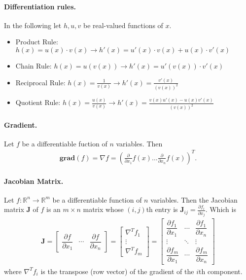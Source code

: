 \documentclass[a4paper,11pt]{article}
\begin{document}
\paragraph{Differentiation rules.} In the following let $h, u, v$ be real-valued functions of $x$.
\begin{itemize}
    \item Product Rule: $h(x) = u(x) \cdot v(x) \rightarrow h'(x) = u'(x) \cdot v(x) + u(x) \cdot v'(x)$
    \item Chain Rule: $h(x) = u(v(x)) \rightarrow  h'(x) = u'(v(x)) \cdot v'(x)$
    \item Reciprocal Rule: $h(x) = \frac{1}{v(x)} \rightarrow  h'(x) = \frac{v'(x)}{(v(x))^2}$
    \item Quotient Rule: $h(x) = \frac{u(x)}{v(x)} \rightarrow  h'(x) = \frac{v(x)u'(x) - u(x)v'(x)}{(v(x))^2}$
\end{itemize}

\paragraph{Gradient.} Let $f$ be a differentiable fuction of $n$ variables. Then
\begin{gather*}
    \mathbf{grad}(f) = \nabla f = \left( \frac{\partial}{\partial x_1} f(x) \dots \frac{\partial}{\partial x_n} f(x) \right)^T.
\end{gather*}

\paragraph{Jacobian Matrix.} Let $f: \mathbb{R}^{n} \rightarrow \mathbb{R}^{m}$ be a differentiable function of $n$ variables. Then the Jacobian matrix $\mathbf {J}$ of $f$ is an $m \times n$ matrix whose $(i,j)$th entry is ${\mathbf {J}_{ij}={\frac {\partial f_{i}}{\partial x_{j}}}}$. Which is 
\begin{gather*}
    {\mathbf {J} ={\begin{bmatrix}{\dfrac {\partial f }{\partial x_{1}}}&\cdots &{\dfrac {\partial f }{\partial x_{n}}}\end{bmatrix}}={\begin{bmatrix}\nabla ^{T}f_{1}\\\vdots \\\nabla ^{T}f_{m}\end{bmatrix}}={\begin{bmatrix}{\dfrac {\partial f_{1}}{\partial x_{1}}}&\cdots &{\dfrac {\partial f_{1}}{\partial x_{n}}}\\\vdots &\ddots &\vdots \\{\dfrac {\partial f_{m}}{\partial x_{1}}}&\cdots &{\dfrac {\partial f_{m}}{\partial x_{n}}}\end{bmatrix}}}
\end{gather*}
where ${\nabla ^{T}f_{i}}$ is the transpose (row vector) of the gradient of the $i$th component.
\end{document}
